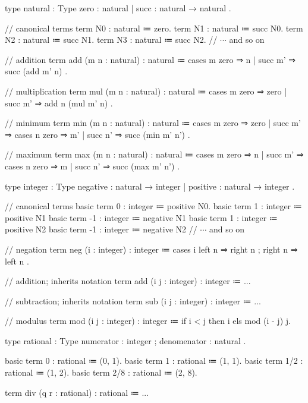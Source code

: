 \begin{program}[caption={natural number}]
type natural : Type
  { zero : natural
  | succ : natural → natural }.

// canonical terms
term N0 : natural ≔ zero.
term N1 : natural ≔ succ N0.
term N2 : natural ≔ succ N1.
term N3 : natural ≔ succ N2.
// $\cdots$ and so on

// addition
term add (m n : natural) : natural
  ≔ cases m
      { zero    ⇒ n
      | succ m' ⇒ succ (add m' n) }.

// multiplication
term mul (m n : natural) : natural
  ≔ cases m
      { zero    ⇒ zero
      | succ m' ⇒ add n (mul m' n) }.

// minimum
term min (m n : natural) : natural
  ≔ cases m
      { zero    ⇒ zero
      | succ m' ⇒ cases n
                    { zero    ⇒ m'
                    | succ n' ⇒ succ (min m' n') } }.

// maximum
term max (m n : natural) : natural
  ≔ cases m
      { zero    ⇒ n
      | succ m' ⇒ cases n
                    { zero    ⇒ m
                    | succ n' ⇒ succ (max m' n') } }.
\end{program}

\begin{program}[caption={integer}]
type integer : Type
  { negative : natural → integer
  | positive : natural → integer }.

// canonical terms
basic term  0 : integer ≔ positive N0.
basic term  1 : integer ≔ positive N1
basic term -1 : integer ≔ negative N1
basic term  1 : integer ≔ positive N2
basic term -1 : integer ≔ negative N2
// $\cdots$ and so on

// negation
term neg (i : integer) : integer
  ≔ cases i
      { left  n ⇒ right n
      ; right n ⇒ left  n }.

// addition; inherits notation
term add (i j : integer) : integer ≔ ...

// subtraction; inherits notation
term sub (i j : integer) : integer ≔ ...

// modulus
term mod (i j : integer) : integer
  ≔ if i < j
      then i
      els mod (i - j) j.
\end{program}

\begin{program}[caption={rational}]
type rational : Type
  { numerator   : integer
  ; denomenator : natural }.

basic term 0   : rational ≔ (0, 1).
basic term 1   : rational ≔ (1, 1).
basic term 1/2 : rational ≔ (1, 2).
basic term 2/8 : rational ≔ (2, 8).

term div (q r : rational) : rational ≔ ...
\end{program}

